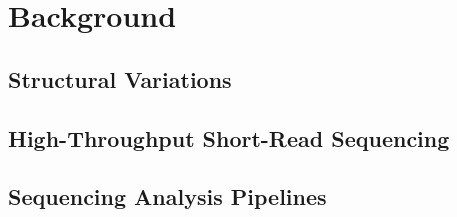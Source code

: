 \chapter{Background}\label{chap_background}

\section{Structural Variations}

\section{High-Throughput Short-Read Sequencing}

\section{Sequencing Analysis Pipelines}
